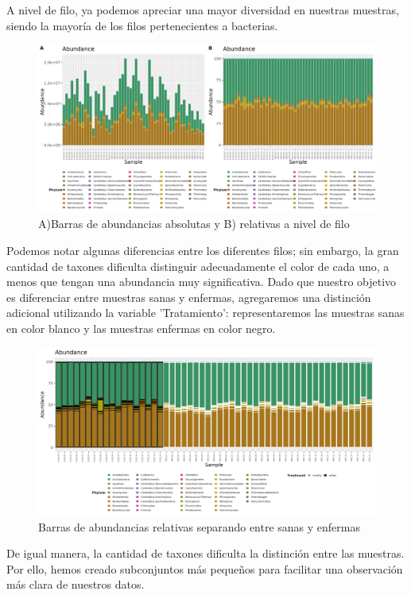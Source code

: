 A nivel de filo, ya podemos apreciar una mayor diversidad en nuestras muestras, siendo la mayoría de los filos pertenecientes a bacterias.\\
\begin{figure}[h]
\centering
\includegraphics[width=\textwidth]{Img/cap2/filo_plot.png}
\caption{A)Barras de abundancias absolutas y B) relativas a nivel de filo}
\end{figure}
Podemos notar algunas diferencias entre los diferentes filos; sin embargo, la gran cantidad de taxones dificulta distinguir adecuadamente el color de cada uno, a menos que tengan una abundancia muy significativa. Dado que nuestro objetivo es diferenciar entre muestras sanas y enfermas, agregaremos una distinción adicional utilizando la variable 'Tratamiento': representaremos las muestras sanas en color blanco y las muestras enfermas en color negro.\\
\begin{figure}[h]
\centering
\includegraphics[width=\textwidth]{Img/cap2/filo_plot_blackandwhite.png}
\caption{Barras de abundancias relativas separando entre sanas y enfermas}
\end{figure}
De igual manera, la cantidad de taxones dificulta la distinción entre las muestras. Por ello, hemos creado subconjuntos más pequeños para facilitar una observación más clara de nuestros datos.\\

